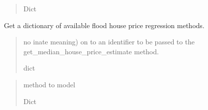 \documentclass[letterpaper,10pt,english]{sphinxmanual}
\begin{document}
\begin{fulllineitems}
\begin{fulllineitems}
\begin{quote}
\begin{description}
\sphinxAtStartPar
Dict

\end{description}\end{quote}

\end{fulllineitems}


\begin{fulllineitems}
\label{\detokenize{index:flood_tool.Tool.get_house_price_methods}}
\pysigstartsignatures
{}
\pysigstopsignatures
\sphinxAtStartPar
Get a dictionary of available flood house price regression methods.
\begin{quote}\begin{description}
\sphinxAtStartPar
\begin{description}
\sphinxAtStartPar
no inate meaning) on to an identifier to be passed to the
get\_median\_house\_price\_estimate method.

\end{description}


\sphinxAtStartPar
dict

\end{description}\end{quote}

\end{fulllineitems}


\begin{fulllineitems}
\label{\detokenize{index:flood_tool.Tool.get_house_price_models}}
\pysigstartsignatures
{}
\pysigstopsignatures\begin{quote}\begin{description}
\sphinxAtStartPar
method to model

\sphinxAtStartPar
Dict


\end{description}
\end{quote}
\end{fulllineitems}
\end{fulllineitems}
\end{document}
